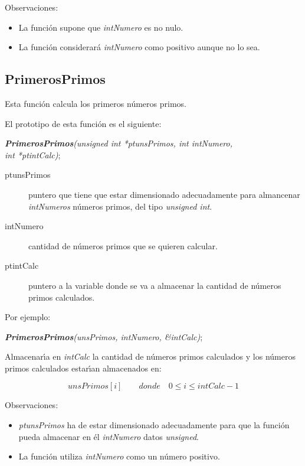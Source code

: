\newpage

Observaciones:

\begin{itemize}
\item La funci\'on supone que \emph{intNumero} es no nulo.
\item La funci\'on considerar\'a \emph{intNumero} como positivo aunque no lo
sea.
\end{itemize}

\subsection{PrimerosPrimos}

Esta funci\'on calcula los primeros n\'umeros primos.\newline

El prototipo de esta funci\'on es el siguiente:

\begin{center}
\emph{\textbf{PrimerosPrimos}(unsigned int *ptunsPrimos, int intNumero,\\
int *ptintCalc)};
\end{center}

\begin{description}
\item[ptunsPrimos] puntero que tiene que estar dimensionado adecuadamente
para almancenar \emph{intNumeros} n\'umeros primos, del tipo
\emph{unsigned int}.
\item[intNumero] cantidad de n\'umeros primos que se quieren calcular.
\item[ptintCalc] puntero a la variable donde se va a almacenar la cantidad
de n\'umeros primos calculados.
\end{description}

Por ejemplo:

\begin{center}
\emph{\textbf{PrimerosPrimos}(unsPrimos, intNumero, \&intCalc)};
\end{center}

Almacenar\'{\i}a en \emph{intCalc} la cantidad de n\'umeros primos calculados y
los n\'umeros primos calculados estar\'{\i}an almacenados en:

\begin{displaymath} 
unsPrimos[i] \qquad donde \quad 0 \le i \le intCalc-1
\end{displaymath}

Observaciones:

\begin{itemize}
\item \emph{ptunsPrimos} ha de estar dimensionado adecuadamente para que la
funci\'on pueda almacenar en \'el \emph{intNumero} datos \emph{unsigned}.
\item La funci\'on utiliza \emph{intNumero} como un n\'umero positivo.
\end{itemize}
